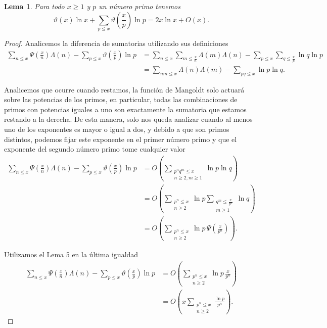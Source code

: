 \documentclass{article}
\newtheorem{lemma}[theorem]{Lema}
\theoremstyle{definition}
\theoremstyle{remark}
\begin{document}
\begin{lemma}
Para todo $x \geq 1$ y $p$ un n\'umero primo tenemos
$$\vartheta(x)\ln x + \sum_{p \leq x} \vartheta\left(\frac{x}{p}\right)\ln p = 2x\ln x + O(x).$$
\end{lemma}

\begin{proof}
Analicemos la diferencia de sumatorias utilizando sus definiciones
\begin{align*}
\sum_{n \leq x} \Psi\left(\frac{x}{n}\right)\Lambda(n) - \sum_{p \leq x} \vartheta\left(\frac{x}{p}\right)\ln p
&= \sum_{n \leq x} \sum_{m \leq \frac{x}{n}} \Lambda(m)\Lambda(n) - \sum_{p \leq x} \sum_{q \leq \frac{x}{p}} \ln q \ln p \\
&= \sum_{nm \leq x} \Lambda(n)\Lambda(m) - \sum_{pq \leq x} \ln p \ln q.
\end{align*}

Analicemos que ocurre cuando restamos, la funci\'on de Mangoldt solo actuar\'a sobre las potencias de los primos,
en particular, todas las combinaciones de primos con potencias iguales a uno son exactamente la sumatoria que estamos restando a la derecha.
De esta manera, solo nos queda analizar cuando al menos uno de los exponentes es mayor o igual a dos, y debido a que son primos distintos,
podemos fijar este exponente en el primer n\'umero primo y que el exponente del segundo n\'umero primo tome cualquier valor
\begin{align*}
\sum_{n \leq x} \Psi\left(\frac{x}{n}\right)\Lambda(n) - \sum_{p \leq x} \vartheta\left(\frac{x}{p}\right)\ln p
&= O\left(\sum_{\substack{p^n q^m \leq x \\ n \geq 2, m \geq 1}} \ln p \ln q\right) \\
&= O\left(\sum_{\substack{p^n \leq x \\ n \geq 2}} \ln p \sum_{\substack{q^m \leq \frac{x}{p^n} \\ m \geq 1}} \ln q\right) \\
&= O\left(\sum_{\substack{p^n \leq x \\ n \geq 2}} \ln p \, \Psi\left(\frac{x}{p^n}\right)\right).
\end{align*}

Utilizamos el Lema 5 en la \'ultima igualdad
\begin{align*}
\sum_{n \leq x} \Psi\left(\frac{x}{n}\right)\Lambda(n) - \sum_{p \leq x} \vartheta\left(\frac{x}{p}\right)\ln p
&= O\left(\sum_{\substack{p^n \leq x \\ n \geq 2}} \ln p \, \frac{x}{p^n}\right) \\
&= O\left(x\sum_{\substack{p^n \leq x \\ n \geq 2}} \frac{\ln p}{p^n}\right).
\end{align*}


\end{proof}
\end{document}
